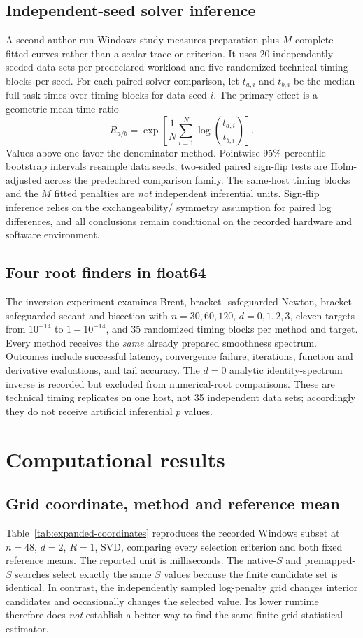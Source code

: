 \subsection{Independent-seed solver inference}
A second author-run Windows study measures
preparation plus $M$ complete fitted curves
rather than a scalar trace or criterion.
It uses 20 independently seeded data sets
per predeclared workload and five randomized
technical timing blocks per seed.
For each paired solver comparison, let
$t_{a,i}$ and $t_{b,i}$ be the median full-task
times over timing blocks for data seed $i$.
The primary effect is a geometric mean time ratio
\[
R_{a/b}=\exp\left[
  \frac1N\sum_{i=1}^N\log
  \left(\frac{t_{a,i}}{t_{b,i}}\right)
\right].
\]
Values above one favor the denominator method.
Pointwise 95\% percentile bootstrap intervals
resample data seeds; two-sided paired sign-flip
tests are Holm-adjusted across the predeclared
comparison family. The same-host timing blocks
and the $M$ fitted penalties are \emph{not}
independent inferential units.
Sign-flip inference relies on the exchangeability/
symmetry assumption for paired log differences,
and all conclusions remain conditional on the
recorded hardware and software environment.

\subsection{Four root finders in float64}
The inversion experiment examines Brent, bracket-
safeguarded Newton, bracket-safeguarded secant and
bisection with $n=30,60,120$, $d=0,1,2,3$,
eleven targets from $10^{-14}$ to $1-10^{-14}$,
and 35 randomized timing blocks per method and
target. Every method receives the \emph{same}
already prepared smoothness spectrum.
Outcomes include successful latency, convergence
failure, iterations, function and derivative
evaluations, and tail accuracy. The $d=0$
analytic identity-spectrum inverse is recorded
but excluded from numerical-root comparisons.
These are technical timing replicates on one
host, not 35 independent data sets; accordingly
they do not receive artificial inferential
$p$ values.

\section{Computational results}\label{sec:expanded-results}
\subsection{Grid coordinate, method and reference mean}
Table~\ref{tab:expanded-coordinates} reproduces
the recorded Windows subset at $n=48$,
$d=2$, $R=1$, SVD, comparing every
selection criterion and both fixed reference
means. The reported unit is milliseconds.
The native-$S$ and premapped-$S$ searches
select exactly the same $S$ values because
the finite candidate set is identical.
In contrast, the independently sampled
log-penalty grid changes interior candidates
and occasionally changes the selected value.
Its lower runtime therefore does \emph{not}
establish a better way to find the same
finite-grid statistical estimator.

